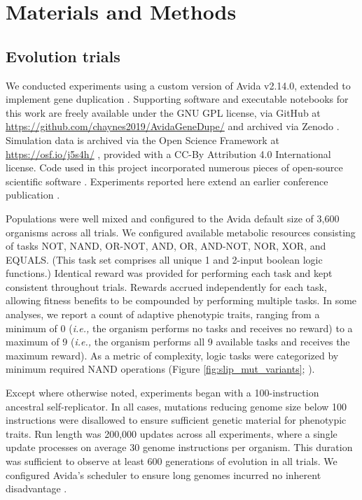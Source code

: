 \section{Materials and Methods} \label{sec:methods}

\subsection{Evolution trials}

We conducted experiments using a custom version of Avida v2.14.0, extended to implement gene duplication \citep{Ofria:2009avida}.
Supporting software and executable notebooks for this work are freely available under the GNU GPL license, via GitHub at \url{https://github.com/chaynes2019/AvidaGeneDupe/} and archived via Zenodo \citep{haynes_2025,https://doi.org/10.25495/7gxk-rd71}.
Simulation data is archived via the Open Science Framework at \url{https://osf.io/j5s4h/} \citep{Moreno_Haynes_2025,foster2017open}, provided with a CC-By Attribution 4.0 International license.
Code used in this project incorporated numerous pieces of open-source scientific software \citep{2020SciPy-NMeth,harris2020array,reback2020pandas,mckinney-proc-scipy-2010,waskom2021seaborn,hunter2007matplotlib,moreno2023teeplot,r_core_team_r:_2015}.
Experiments reported here extend an earlier conference publication \citep{lalejini2017gene}.

Populations were well mixed and configured to the Avida default size of 3,600 organisms across all trials.
We configured available metabolic resources consisting of tasks NOT, NAND, OR-NOT, AND, OR, AND-NOT, NOR, XOR, and EQUALS.
(This task set comprises all unique 1 and 2-input boolean logic functions.)
Identical reward was provided for performing each task and kept consistent throughout trials.
Rewards accrued independently for each task, allowing fitness benefits to be compounded by performing multiple tasks.
In some analyses, we report a count of adaptive phenotypic traits, ranging from a minimum of 0 (\textit{i.e.,} the organism performs no tasks and receives no reward) to a maximum of 9 (\textit{i.e.,} the organism performs all 9 available tasks and receives the maximum reward).
As a metric of complexity, logic tasks were categorized by minimum required NAND operations (Figure \ref{fig:slip_mut_variants}; \citep{Lenski2003Evolutionary}).

Except where otherwise noted, experiments began with a 100-instruction ancestral self-replicator.
In all cases, mutations reducing genome size below 100 instructions were disallowed to ensure sufficient genetic material for phenotypic traits.
Run length was 200,000 updates across all experiments, where a single update processes on average 30 genome instructions per organism.
This duration was sufficient to observe at least 600 generations of evolution in all trials.
We configured Avida's scheduler to ensure long genomes incurred no inherent disadvantage \citep{Ofria:2009avida}.

